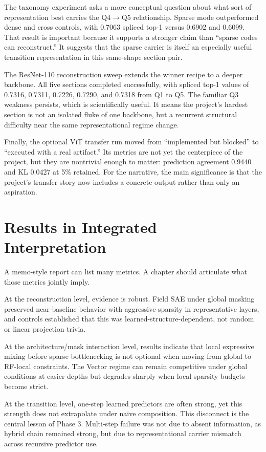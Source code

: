 \documentclass[11pt]{article}
\begin{document}
The taxonomy experiment asks a more conceptual question about what sort of representation best carries the Q4$\rightarrow$Q5 relationship. Sparse mode outperformed dense and cross controls, with 0.7063 spliced top-1 versus 0.6902 and 0.6099. That result is important because it supports a stronger claim than ``sparse codes can reconstruct.'' It suggests that the sparse carrier is itself an especially useful transition representation in this same-shape section pair.

The ResNet-110 reconstruction sweep extends the winner recipe to a deeper backbone. All five sections completed successfully, with spliced top-1 values of 0.7316, 0.7311, 0.7226, 0.7290, and 0.7318 from Q1 to Q5. The familiar Q3 weakness persists, which is scientifically useful. It means the project's hardest section is not an isolated fluke of one backbone, but a recurrent structural difficulty near the same representational regime change.

Finally, the optional ViT transfer run moved from ``implemented but blocked'' to ``executed with a real artifact.'' Its metrics are not yet the centerpiece of the project, but they are nontrivial enough to matter: prediction agreement 0.9440 and KL 0.0427 at 5\% retained. For the narrative, the main significance is that the project's transfer story now includes a concrete output rather than only an aspiration.

\section{Results in Integrated Interpretation}
A memo-style report can list many metrics. A chapter should articulate what those metrics jointly imply.

At the reconstruction level, evidence is robust. Field SAE under global masking preserved near-baseline behavior with aggressive sparsity in representative layers, and controls established that this was learned-structure-dependent, not random or linear projection trivia.

At the architecture/mask interaction level, results indicate that local expressive mixing before sparse bottlenecking is not optional when moving from global to RF-local constraints. The Vector regime can remain competitive under global conditions at easier depths but degrades sharply when local sparsity budgets become strict.

At the transition level, one-step learned predictors are often strong, yet this strength does not extrapolate under naive composition. This disconnect is the central lesson of Phase 3. Multi-step failure was not due to absent information, as hybrid chain remained strong, but due to representational carrier mismatch across recursive predictor use.
\end{document}

